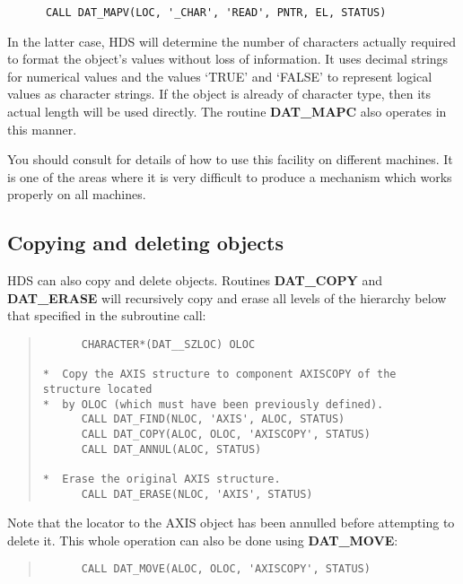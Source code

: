 \begin{small}
\begin{verbatim}
      CALL DAT_MAPV(LOC, '_CHAR', 'READ', PNTR, EL, STATUS)
\end{verbatim}
\end{small}


In the latter case, HDS will determine the number of characters actually
required to format the object's values without loss of information.
It uses decimal strings for numerical values and the values `TRUE' and `FALSE'
to represent logical values as character strings.
If the object is already of character type, then its actual length will be
used directly.
The routine {\bf DAT\_MAPC} also operates in this manner.

You should consult  for details of how to use this
facility on different machines.
It is one of the areas where it is very difficult to produce a mechanism which
works properly on all machines. 

\subsection{Copying and deleting objects}

HDS can also copy and delete objects. 
Routines {\bf DAT\_COPY} and {\bf DAT\_ERASE} will recursively copy and erase
all levels of the hierarchy below that specified in the subroutine call: 

\begin{quote}

\begin{small}
\begin{verbatim}
      CHARACTER*(DAT__SZLOC) OLOC

*  Copy the AXIS structure to component AXISCOPY of the structure located
*  by OLOC (which must have been previously defined).
      CALL DAT_FIND(NLOC, 'AXIS', ALOC, STATUS)
      CALL DAT_COPY(ALOC, OLOC, 'AXISCOPY', STATUS)
      CALL DAT_ANNUL(ALOC, STATUS)

*  Erase the original AXIS structure.
      CALL DAT_ERASE(NLOC, 'AXIS', STATUS)
\end{verbatim}
\end{small}

\end{quote}
Note that the locator to the AXIS object has been annulled before attempting to
delete it.
This whole operation can also be done using {\bf DAT\_MOVE}:
\begin{quote}

\begin{small}
\begin{verbatim}
      CALL DAT_MOVE(ALOC, OLOC, 'AXISCOPY', STATUS)
\end{verbatim}
\end{small}

\end{quote}


